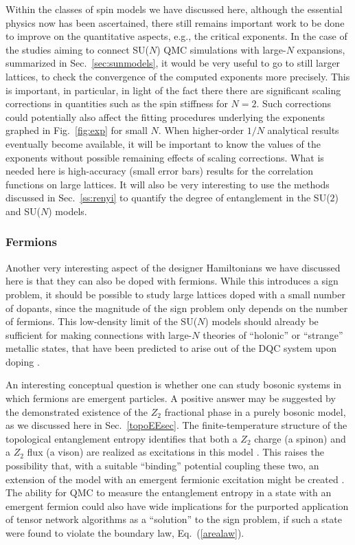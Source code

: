 \documentclass[10pt,pre,aps,twocolumn,showpacs,subscriptaddresses,floatfix]{revtex4}
\begin{document}
Within the classes of spin models we have discussed here, although the essential physics now has been ascertained, there still remains
important work to be done to improve on the quantitative aspects, e.g., the critical exponents. In the case of the studies aiming to connect
SU($N$) QMC simulations with large-$N$ expansions, summarized in Sec.~\ref{sec:sunmodels}, it would be very useful to go to still larger lattices, 
to check the convergence of the computed exponents more precisely. This is important, in particular, in light of the fact there there are significant scaling 
corrections in quantities such as the spin stiffness for $N=2$. Such corrections could potentially also affect the fitting procedures underlying 
the exponents graphed in Fig.~\ref{fig:exp} for small $N$. When higher-order $1/N$ analytical results eventually become available, it will be important to know 
the values of the exponents without possible remaining effects of scaling corrections. What is needed here is high-accuracy (small error bars) 
results for the correlation functions on large lattices. It will also be very interesting to use the methods discussed in Sec.~\ref{ss:renyi} to quantify 
the degree of entanglement in the SU($2$) and SU($N$) models.


\subsubsection{Fermions}

Another very interesting aspect of the designer Hamiltonians we have discussed here is that they can also be doped with fermions. While this 
introduces a sign problem, it should be possible to study large lattices doped with a small number of dopants, since the magnitude of the 
sign problem only depends on the number of fermions. This low-density limit of the SU($N$) models should already be sufficient for making connections 
with large-$N$ theories of ``holonic'' or ``strange'' metallic states, that have been predicted to arise out of the DQC system upon 
doping \cite{kaul2008:u1}.

An interesting conceptual question is whether one can study bosonic systems in which fermions are emergent particles.
A positive answer may be suggested by the demonstrated existence of the $Z_2$ fractional phase in a purely bosonic model, as we
discussed here in Sec.~\ref{topoEEsec}. 
The finite-temperature structure of the topological entanglement entropy identifies that both a $Z_2$ charge (a spinon) and a $Z_2$ flux (a vison) are realized as excitations in this model \cite{TopoEE}.
This raises the possibility that, with a suitable ``binding'' potential \cite{FermionBind} coupling these two, an extension of 
the model with an emergent fermionic excitation might be created \cite{Wenbook}.  
The ability for QMC to measure the entanglement entropy in a state with an emergent fermion
could also have wide implications for the purported application of tensor network algorithms as a ``solution'' to the sign problem, 
if such a state were found to violate the boundary law, Eq.~(\ref{arealaw}). 
\end{document}
